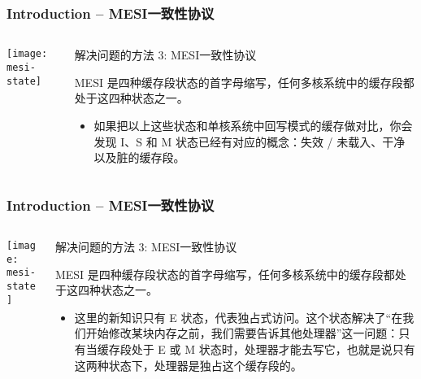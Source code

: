 \begin{frame}[plain]	
	\frametitle{Introduction -- MESI一致性协议}
	
	
	\begin{columns}
		
		\begin{column}{.4\textwidth}
			\texttt{[image: mesi-state]}
		\end{column}
		\begin{column}{.6\textwidth}
			解决问题的方法 3: MESI一致性协议
			
			MESI 是四种缓存段状态的首字母缩写，任何多核系统中的缓存段都处于这四种状态之一。
			\begin{itemize}
				\item 如果把以上这些状态和单核系统中回写模式的缓存做对比，你会发现 I、S 和 M 状态已经有对应的概念：失效 / 未载入、干净以及脏的缓存段。
			\end{itemize}
			
		\end{column}
	\end{columns}
	
\end{frame}


\begin{frame}[plain]	
	\frametitle{Introduction -- MESI一致性协议}
	
	
	\begin{columns}
		
		\begin{column}{.4\textwidth}
			\texttt{[image: mesi-state]}
		\end{column}
		\begin{column}{.6\textwidth}
			解决问题的方法 3: MESI一致性协议
			
			MESI 是四种缓存段状态的首字母缩写，任何多核系统中的缓存段都处于这四种状态之一。
			\begin{itemize}

				\item 这里的新知识只有 E 状态，代表独占式访问。这个状态解决了“在我们开始修改某块内存之前，我们需要告诉其他处理器”这一问题：只有当缓存段处于 E 或 M 状态时，处理器才能去写它，也就是说只有这两种状态下，处理器是独占这个缓存段的。
			\end{itemize}
			
		\end{column}
	\end{columns}
	
\end{frame}


